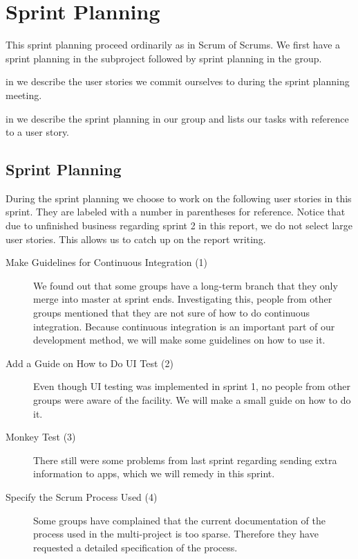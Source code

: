 \chapter{Sprint Planning}\label{chap:s3_sprintplanning}
This sprint planning proceed ordinarily as in Scrum of Scrums. We first have a sprint planning in the subproject followed by sprint planning in the group.

\begin{chapterorganization}
  \item in  we describe the user stories we commit ourselves to during the \bd sprint planning meeting.
  \item in  we describe the sprint planning in our group and lists our tasks with reference to a user story.
\end{chapterorganization}

\section{\bdtitle Sprint Planning}\label{sec:S3_bd}
During the \bd sprint planning we choose to work on the following user stories in this sprint. They are labeled with a number in parentheses for reference. Notice that due to unfinished business regarding sprint 2 in this report, we do not select large user stories. This allows us to catch up on the report writing.

\begin{description}
  \item[Make Guidelines for Continuous Integration (1)] We found out that some groups have a long-term branch that they only merge into master at sprint ends. Investigating this, people from other groups mentioned that they are not sure of how to do continuous integration. Because continuous integration is an important part of our development method, we will make some guidelines on how to use it.
  \item[Add a Guide on How to Do UI Test (2)] Even though UI testing was implemented in sprint 1, no people from other groups were aware of the facility. We will make a small guide on how to do it.
  \item[Monkey Test (3)] There still were some problems from last sprint regarding sending extra information to apps, which we will remedy in this sprint.
  \item[Specify the Scrum Process Used (4)] Some groups have complained that the current documentation of the process used in the multi-project is too sparse. Therefore they have requested a detailed specification of the process.
\end{description}


